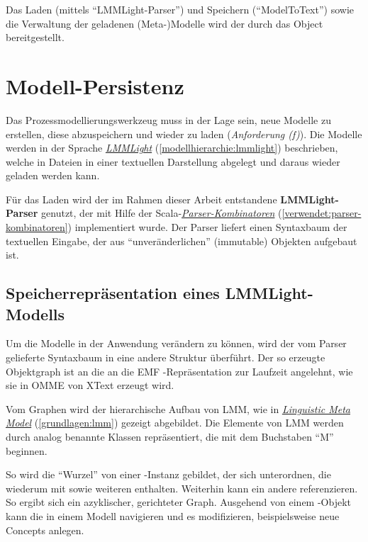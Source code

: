 \documentclass[a4paper,10pt]{sphinxmanual}
\begin{document}
Das Laden (mittels "`LMMLight-Parser"') und Speichern ("`ModelToText"') sowie die Verwaltung der geladenen (Meta-)Modelle wird der  durch das Object  bereitgestellt.


\section{Modell-Persistenz}
\label{modellanbindung:modell-persistenz}
Das Prozessmodellierungswerkzeug muss in der Lage sein, neue Modelle zu erstellen, diese abzuspeichern und wieder zu laden (\emph{Anforderung (f)}).
Die Modelle werden in der Sprache {\hyperref[modellhierarchie:lmmlight]{\emph{LMMLight}}} (\autoref*{modellhierarchie:lmmlight}) beschrieben, welche in Dateien in einer textuellen Darstellung abgelegt und daraus wieder geladen werden kann.

Für das Laden wird der im Rahmen dieser Arbeit entstandene \textbf{LMMLight-Parser} genutzt, der mit Hilfe der Scala-{\hyperref[verwendet:parser-kombinatoren]{\emph{Parser-Kombinatoren}}} (\autoref*{verwendet:parser-kombinatoren}) implementiert wurde.
Der Parser liefert einen Syntaxbaum der textuellen Eingabe, der aus "`unveränderlichen"' (immutable) Objekten aufgebaut ist.


\subsection{Speicherrepräsentation eines LMMLight-Modells}
\label{modellanbindung:speicherreprasentation-eines-lmmlight-modells}
Um die Modelle in der Anwendung verändern zu können, wird der vom Parser gelieferte Syntaxbaum in eine andere Struktur überführt.
Der so erzeugte Objektgraph ist an die an die EMF \cite{www:emf}-Repräsentation zur Laufzeit angelehnt, wie sie in OMME von XText \cite{www:xtext} erzeugt wird.

Vom Graphen wird der hierarchische Aufbau von LMM, wie in {\hyperref[grundlagen:lmm]{\emph{Linguistic Meta Model}}} (\autoref*{grundlagen:lmm}) gezeigt abgebildet.
Die Elemente von LMM werden durch analog benannte Klassen repräsentiert, die mit dem Buchstaben "`M"' beginnen.

So wird die "`Wurzel"' von einer -Instanz gebildet, der sich  unterordnen, die wiederum  mit  sowie weiteren  enthalten.
Weiterhin kann ein  andere  referenzieren. So ergibt sich ein azyklischer, gerichteter Graph.
Ausgehend von einem -Objekt kann die  in einem Modell navigieren und es modifizieren, beispielsweise neue Concepts anlegen.
\end{document}

